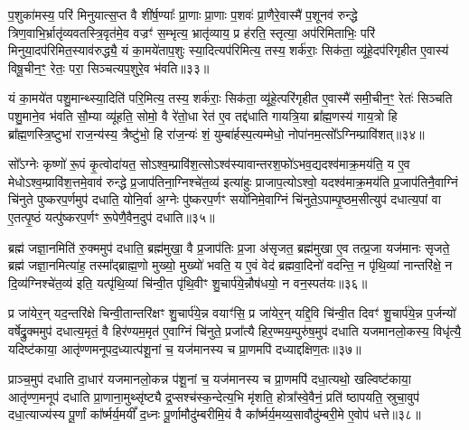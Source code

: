 प॒शुका॑मस्य॒ परि॑ मिनुयात्स॒प्त वै शी॑र्\mbox{}ष॒ण्याः᳚ प्रा॒णाः प्रा॒णाः प॒शवः॑ प्रा॒णैरे॒वास्मै॑ प॒शूनव॑ रुन्द्धे त्रिण॒वाभि॒\-र्भ्रातृ॑व्यवतस्त्रि॒वृत॑मे॒व वज्रꣳ॑ स॒म्भृत्य॒ भ्रातृ॑व्याय॒ प्र ह॑रति॒ स्तृत्या॒ अप॑रिमिताभिः॒ परि॑ मिनुया॒दप॑रिमित॒स्याव॑रुद्ध्यै॒ यं का॒मये॑ताप॒शुः स्या॒दित्यप॑रिमित्य॒ तस्य॒ शर्क॑राः॒ सिक॑ता॒ व्यू॑हे॒दप॑रिगृहीत ए॒वास्य॑ विषू॒चीन॒ꣳ॒ रेतः॒ परा॒ सिञ्चत्यप॒शुरे॒व भ॑वति॥३३॥

यं का॒मये॑त पशु॒मान्थ्स्या॒दिति॑ परि॒मित्य॒ तस्य॒ शर्क॑राः॒ सिक॑ता॒ व्यू॑हे॒त्परि॑गृहीत ए॒वास्मै॑ समी॒चीन॒ꣳ॒ रेतः॑ सिञ्चति पशु॒माने॒व भ॑वति सौ॒म्या व्यू॑हति॒ सोमो॒ वै रे॑तो॒धा रेत॑ ए॒व तद्द॑धाति गायत्रि॒या ब्रा᳚ह्म॒णस्य॑ गाय॒त्रो हि ब्रा᳚ह्म॒णस्त्रि॒ष्टुभा॑ राज॒न्य॑स्य॒ त्रैष्टु॑भो॒ हि रा॑ज॒न्यः॑ शं॒ युम्बा॑र्\mbox{}हस्प॒त्यम्मेधो॒ नोपा॑नम॒त्सो᳚\-ऽग्निम्प्रावि॑शत्॥३४॥

सो᳚\-ऽग्नेः कृष्णो॑ रू॒पं कृ॒त्वोदा॑यत॒ सो\-ऽश्व॒म्प्रावि॑श॒त्सो\-ऽश्व॑स्यावान्तरश॒फो॑\-ऽभव॒द्यदश्व॑माक्र॒मय॑ति॒ य ए॒व मेधो\-ऽश्व॒म्प्रावि॑श॒त्तमे॒वाव॑ रुन्द्धे प्र॒जाप॑तिना॒ग्निश्चे॑त॒व्य॑ इत्या॑हुः प्राजाप॒त्यो\-ऽश्वो॒ यदश्व॑माक्र॒मय॑ति प्र॒जाप॑तिनै॒वाग्निं चि॑नुते पुष्करप॒र्णमुप॑ दधाति॒ योनि॒र्वा अ॒ग्नेः पु॑ष्करप॒र्णꣳ सयो॑निमे॒वाग्निं चि॑नुते॒\-ऽपाम्पृ॒ष्ठम॒सीत्युप॑ दधात्य॒पां वा ए॒तत्पृ॒ष्ठं यत्पु॑ष्करप॒र्णꣳ रू॒पेणै॒वैन॒दुप॑ दधाति॥३५॥

{\anuvakamend[{इन्द्रः॑ प॒शुका॑मस्य भवत्यविश॒थ्सयो॑निं विꣳश॒तिश्च॑॥६॥}]}

ब्रह्म॑ जज्ञा॒नमिति॑ रु॒क्ममुप॑ दधाति॒ ब्रह्म॑मुखा॒ वै प्र॒जाप॑तिः प्र॒जा अ॑सृजत॒ ब्रह्म॑मुखा ए॒व तत्प्र॒जा यज॑मानः सृजते॒ ब्रह्म॑ जज्ञा॒नमित्या॑ह॒ तस्मा᳚द्ब्राह्म॒णो मुख्यो॒ मुख्यो॑ भवति॒ य ए॒वं वेद॑ ब्रह्मवा॒दिनो॑ वदन्ति॒ न पृ॑थि॒व्यां नान्तरि॑क्षे॒ न दि॒व्य॑ग्निश्चे॑त॒व्य॑ इति॒ यत्पृ॑थि॒व्यां चि॑न्वी॒त पृ॑थि॒वीꣳ शु॒चार्प॑ये॒न्नौष॑धयो॒ न वन॒स्पत॑यः॥३६॥

प्र जा॑येर॒न् यद॒न्तरि॑क्षे चिन्वी॒तान्तरि॑क्षꣳ शु॒चार्प॑ये॒न्न वयाꣳ॑सि॒ प्र जा॑येर॒न् यद्दि॒वि चि॑न्वी॒त दिवꣳ॑ शु॒चार्प॑ये॒न्न प॒र्जन्यो॑ वर्\mbox{}षेद्रु॒क्ममुप॑ दधात्य॒मृतं॒ वै हिर॑ण्यम॒मृत॑ ए॒वाग्निं चि॑नुते॒ प्रजा᳚त्यै हिर॒ण्मय॒म्पुरु॑ष॒मुप॑ दधाति यजमानलो॒कस्य॒ विधृ॑त्यै॒ यदिष्ट॑काया॒ आतृ॑ण्णमनूपद॒ध्यात्प॑शू॒नां च॒ यज॑मानस्य च प्रा॒णमपि॑ दध्याद्दक्षिण॒तः॥३७॥

प्राञ्च॒मुप॑ दधाति दा॒धार॑ यजमानलो॒कन्न प॑शू॒नां च॒ यज॑मानस्य च प्रा॒णमपि॑ दधा॒त्यथो॒ खल्विष्ट॑काया॒ आतृ॑ण्ण॒मनूप॑ दधाति प्रा॒णाना॒मुथ्सृ॑ष्ट्यै द्र॒प्सश्च॑स्क॒न्देत्य॒भि मृ॑शति॒ होत्रा᳚स्वे॒वैनं॒ प्रति॑ ष्ठापयति॒ स्रुचा॒वुप॑ दधा॒त्याज्य॑स्य पू॒र्णां का᳚र्ष्मर्य॒मयीं᳚ द॒ध्नः पू॒र्णामौदु॑म्बरीमि॒यं वै का᳚र्ष्मर्य॒मय्य॒सावौदु॑म्बरी॒मे ए॒वोप॑ धत्ते॥३८॥


